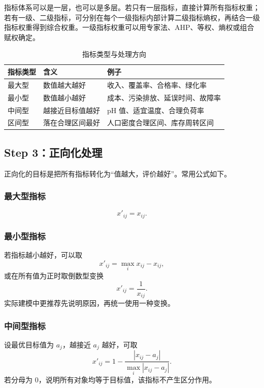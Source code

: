 \documentclass[UTF8,a4paper,12pt]{ctexart}
\begin{document}
指标体系可以是一层，也可以是多层。若只有一层指标，直接计算所有指标权重；若有一级、二级指标，可分别在每个一级指标内部计算二级指标熵权，再结合一级指标权重得到综合权重。一级指标权重可以用专家法、AHP、等权、熵权或组合赋权确定。

\begin{table}[H]
\centering
\caption{指标类型与处理方向}
\begin{tabular}{p{2.6cm}p{5.4cm}p{5.6cm}}
\toprule
指标类型 & 含义 & 例子\\
\midrule
最大型 & 数值越大越好 & 收入、覆盖率、合格率、绿化率\\
最小型 & 数值越小越好 & 成本、污染排放、延误时间、故障率\\
中间型 & 越接近目标值越好 & pH 值、适宜温度、合理负荷率\\
区间型 & 落在合理区间最好 & 人口密度合理区间、库存周转区间\\
\bottomrule
\end{tabular}
\end{table}

\subsection{Step 3：正向化处理}

正向化的目标是把所有指标转化为“值越大，评价越好”。常用公式如下。

\subsubsection{最大型指标}
\begin{equation}
 x'_{ij}=x_{ij}.
\end{equation}

\subsubsection{最小型指标}
若指标越小越好，可以取
\begin{equation}
 x'_{ij}=\max_i x_{ij}-x_{ij},
\end{equation}
或在所有值为正时取倒数型变换
\begin{equation}
 x'_{ij}=\frac{1}{x_{ij}}.
\end{equation}
实际建模中更推荐先说明原因，再统一使用一种变换。

\subsubsection{中间型指标}
设最优目标值为 $a_j$，越接近 $a_j$ 越好，可取
\begin{equation}
 x'_{ij}=1-\frac{|x_{ij}-a_j|}{\max_i |x_{ij}-a_j|}.
\end{equation}
若分母为 $0$，说明所有对象均等于目标值，该指标不产生区分作用。
\end{document}
